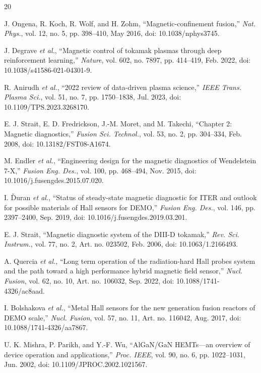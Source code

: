 \documentclass{IEEE_lsens}
\begin{document}
\begin{thebibliography}{20}

J. Ongena, R. Koch, R. Wolf, and H. Zohm, ``Magnetic-confinement fusion,'' \emph{Nat. Phys.}, vol. 12, no. 5, pp. 398--410, May 2016, doi: 10.1038/nphys3745.

J. Degrave \emph{et al.}, ``Magnetic control of tokamak plasmas through deep reinforcement learning,'' \emph{Nature}, vol. 602, no. 7897, pp. 414--419, Feb. 2022, doi: 10.1038/s41586-021-04301-9.

R. Anirudh \emph{et al.}, ``2022 review of data-driven plasma science,'' \emph{IEEE Trans. Plasma Sci.}, vol. 51, no. 7, pp. 1750--1838, Jul. 2023, doi: 10.1109/TPS.2023.3268170.

E. J. Strait, E. D. Fredrickson, J.-M. Moret, and M. Takechi, ``Chapter 2: Magnetic diagnostics,'' \emph{Fusion Sci. Technol.}, vol. 53, no. 2, pp. 304--334, Feb. 2008, doi: 10.13182/FST08-A1674.

M. Endler \emph{et al.}, ``Engineering design for the magnetic diagnostics of Wendelstein 7-X,'' \emph{Fusion Eng. Des.}, vol. 100, pp. 468--494, Nov. 2015, doi: 10.1016/j.fusengdes.2015.07.020.

I. \v{D}uran \emph{et al.}, ``Status of steady-state magnetic diagnostic for ITER and outlook for possible materials of Hall sensors for DEMO,'' \emph{Fusion Eng. Des.}, vol. 146, pp. 2397--2400, Sep. 2019, doi: 10.1016/j.fusengdes.2019.03.201.

E. J. Strait, ``Magnetic diagnostic system of the DIII-D tokamak,'' \emph{Rev. Sci. Instrum.}, vol. 77, no. 2, Art. no. 023502, Feb. 2006, doi: 10.1063/1.2166493.

A. Quercia \emph{et al.}, ``Long term operation of the radiation-hard Hall probes system and the path toward a high performance hybrid magnetic field sensor,'' \emph{Nucl. Fusion}, vol. 62, no. 10, Art. no. 106032, Sep. 2022, doi: 10.1088/1741-4326/ac8aad.

I. Bolshakova \emph{et al.}, ``Metal Hall sensors for the new generation fusion reactors of DEMO scale,'' \emph{Nucl. Fusion}, vol. 57, no. 11, Art. no. 116042, Aug. 2017, doi: 10.1088/1741-4326/aa7867.

U. K. Mishra, P. Parikh, and Y.-F. Wu, ``AlGaN/GaN HEMTs---an overview of device operation and applications,'' \emph{Proc. IEEE}, vol. 90, no. 6, pp. 1022--1031, Jun. 2002, doi: 10.1109/JPROC.2002.1021567.


\end{thebibliography}
\end{document}
